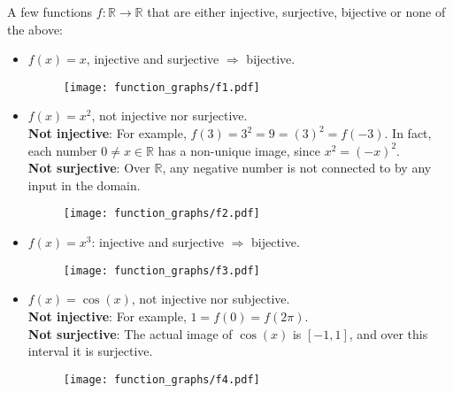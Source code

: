 \begin{example}
  A few functions $f:\mathbb{R}\to\mathbb{R}$ that are either injective, surjective, bijective or none of the above:
  \begin{itemize}
  \item $f(x)=x$, injective and surjective $\Rightarrow$ bijective.
  \begin{figure}[H]
  \centering
  \texttt{[image: function\_graphs/f1.pdf]}
  \end{figure}
  \item $f(x)=x^{2}$, not injective nor surjective.\\
  \textbf{Not injective}: For example, $f(3)=3^{2}=9=(3)^{2}=f(-3)$. In fact, each number $0\neq x\in\mathbb{R}$ has a non-unique image, since $x^{2}=(-x)^{2}$.\\
  \textbf{Not surjective}: Over $\mathbb{R}$, any negative number is not connected to by any input in the domain.
  \begin{figure}[H]
  \centering
  \texttt{[image: function\_graphs/f2.pdf]}
  \end{figure}
  \item $f(x)=x^{3}$: injective and surjective $\Rightarrow$ bijective.
  \begin{figure}[H]
  \centering
  \texttt{[image: function\_graphs/f3.pdf]}
  \end{figure}
  \item $f(x)=\cos(x)$, not injective nor subjective.\\
  \textbf{Not injective}: For example, $1=f(0)=f(2\pi)$.\\
  \textbf{Not surjective}: The actual image of $\cos(x)$ is $\left[ -1,1 \right]$, and over this interval it is surjective.
  \begin{figure}[H]
  \centering
  \texttt{[image: function\_graphs/f4.pdf]}
  \end{figure}
  \end{itemize}
\end{example}

